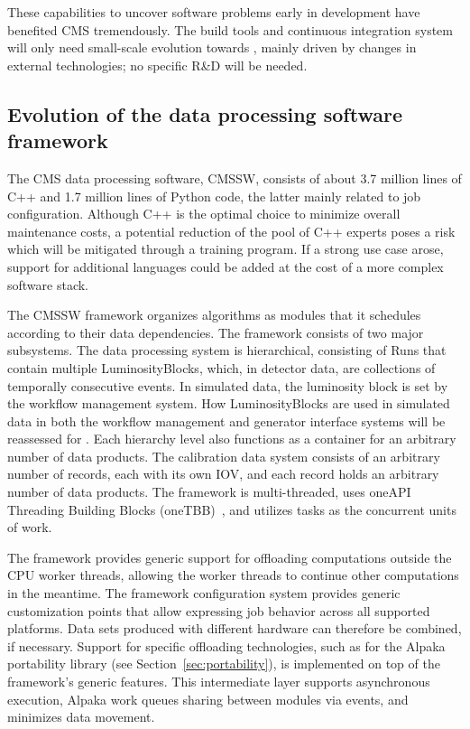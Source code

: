 These capabilities to uncover software problems early in development have benefited CMS tremendously. The build tools and continuous integration system will only need small-scale evolution towards \PhaseTwo, mainly driven by changes in external technologies; no specific R\&D will be needed.


\subsection{Evolution of the data processing software framework}
\label{sec:dataprocessingswframework}

The CMS data processing software, \gls{CMSSW}, consists of about 3.7 million lines of C++ and 1.7 million lines of Python code, the latter mainly related to job configuration. Although C++ is the optimal choice to minimize overall maintenance costs, a potential reduction of the pool of C++ experts poses a risk which will be mitigated through a training program. If a strong use case arose, support for additional languages could be added at the cost of a more complex software stack.

The \gls{CMSSW} framework organizes algorithms as modules that it schedules according to their data dependencies. The framework consists of two major subsystems. The data processing system is hierarchical, consisting of Runs that contain multiple LuminosityBlocks, which, in detector data, are collections of temporally consecutive events. In simulated data, the luminosity block is set by the workflow management system. How LuminosityBlocks are used in simulated data in both the workflow management and generator interface systems will be reassessed for \PhaseTwo. Each hierarchy level also functions as a container for an arbitrary number of data products. The calibration data system consists of an arbitrary number of records, each with its own \gls{IOV}, and each record holds an arbitrary number of data products. The framework is multi-threaded, uses oneAPI Threading Building Blocks (oneTBB)~\cite{onetbb}, and utilizes tasks as the concurrent units of work. 

The framework provides generic support for offloading computations outside the \gls{CPU} worker threads, allowing the worker threads to continue other computations in the meantime. The framework configuration system provides generic customization points that allow expressing job behavior across all supported platforms. Data sets produced with different hardware can therefore be combined, if necessary. Support for specific offloading technologies, such as for the Alpaka portability library (see Section~\ref{sec:portability}), is implemented on top of the framework's generic features. This intermediate layer supports asynchronous execution, Alpaka work queues sharing between modules via events, and minimizes data movement.

